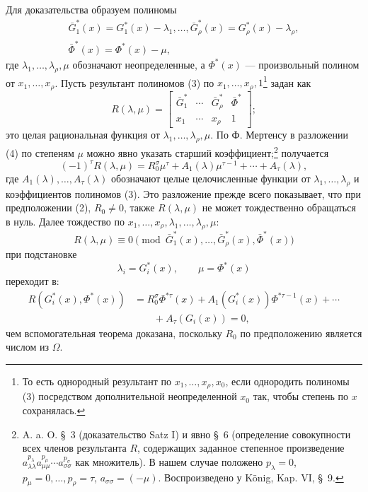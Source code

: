 \documentclass[11pt]{article}
\begin{document}
Для доказательства образуем полиномы
\begin{equation}
\begin{gathered}
  \bar G_1^*(x)=G_1^*(x)-\lambda_1,
  \ldots,
  \bar G_\rho^*(x)=G_\rho^*(x)-\lambda_\rho,\\
  \bar\Phi^*(x)=\Phi^*(x)-\mu,
\end{gathered}
\tag{3}
\end{equation}
где $\lambda_1,\ldots,\lambda_\rho,\mu$ обозначают неопределенные, а $\Phi^*(x)$ --- произвольный полином от $x_1,\ldots,x_\rho$. Пусть результант полиномов (3) по $x_1,\ldots,x_\rho,1$\footnote{То есть однородный результант по $x_1,\ldots,x_\rho,x_0$, если однородить полиномы (3) посредством дополнительной неопределенной $x_0$ так, чтобы степень по $x$ сохранялась.} задан как
\begin{equation}
  R(\lambda,\mu)=\left[
  \begin{array}{cccc}
   \bar G_1^*&\cdots&\bar G_\rho^*&\bar\Phi^*\\
   x_1&\cdots&x_\rho&1
  \end{array}
  \right];
\tag{4}
\end{equation}
это целая рациональная функция от $\lambda_1,\ldots,\lambda_\rho,\mu$. По Ф. Мертенсу в разложении (4) по степеням $\mu$ можно явно указать старший коэффициент;\footnote{A. a. O. \S\ 3 (доказательство Satz I) и явно \S\ 6 (определение совокупности всех членов результанта $R$, содержащих заданное степенное произведение $a_{\lambda\lambda}^{p_\lambda} a_{\mu\mu}^{p_\mu}\cdots a_{\sigma\sigma}^{p_\sigma}$ как множитель). В нашем случае положено $p_\lambda=0$, $p_\mu=0,\ldots,p_\rho=\tau$, $a_{\sigma\sigma}=(-\mu)$. Воспроизведено у König, Kap. VI, \S\ 9.} получается
\begin{equation}
  (-1)^\tau R(\lambda,\mu)
  =R_0^\sigma\mu^\tau+A_1(\lambda)\mu^{\tau-1}+\cdots+A_\tau(\lambda),
\tag{5}
\end{equation}
где $A_1(\lambda),\ldots,A_\tau(\lambda)$ обозначают целые целочисленные функции от $\lambda_1,\ldots,\lambda_\rho$ и коэффициентов полиномов (3). Это разложение прежде всего показывает, что при предположении (2), $R_0\ne0$, также $R(\lambda,\mu)$ не может тождественно обращаться в нуль. Далее тождество по $x_1,\ldots,x_\rho,\lambda_1,\ldots,\lambda_\rho,\mu$:
\[
  R(\lambda,\mu)\equiv 0\pmod{\bar G_1^*(x),\ldots,
  \bar G_\rho^*(x),\bar\Phi^*(x)}
\]
при подстановке
\[
  \lambda_i=G_i^*(x),\qquad \mu=\Phi^*(x)
\]
переходит в:
\begin{equation}
\begin{aligned}
  R(G_i^*(x),\Phi^*(x))
  &=R_0^\sigma\Phi^{*\tau}(x)
    +A_1(G_i^*(x))\Phi^{*\tau-1}(x)+\cdots \\
  &\qquad +A_\tau(G_i(x))=0,
\end{aligned}
\tag{6}
\end{equation}
чем вспомогательная теорема доказана, поскольку $R_0$ по предположению является числом из $\Omega$.
\end{document}
